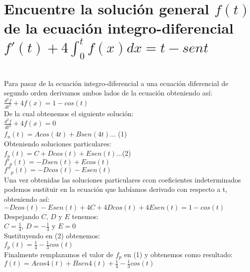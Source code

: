 \section{Encuentre la solución general $f(t)$ de la ecuación integro-diferencial $f'(t)+4 \int_{0}^{t} f(x) dx= t-sent$}\\

Para pasar de la ecuación integro-diferencial a una ecuación diferencial de segundo orden derivamos ambos lados de la ecuación obteniendo así:\\

$\frac{d^{2}f}{dt^{2}}+4f(x)= 1-cos(t)$\\

De la cual obtenemos el siguiente solución:\\

$\frac{d^{2}f}{dt^{2}}+4f(x)=0$\\

$f_n(t)= Acos(4t)+B sen (4t)$... (1)\\

Obteniendo soluciones particulares:\\

$f_p(t)= C + D cos(t) +E sen(t)$...(2)\\

$f'_p(t)= -D sen(t)+ E cos(t)$\\

$f''_p(t)= -D cos(t)- E sen(t)$\\

Una vez obtenidas las soluciones particulares ccon coeficientes indeterminados podemos sustituir en la ecuación que habíamos derivado con respecto a t, obteniendo así:\\

$-Dcos(t)-Esen(t)+4C+4Dcos(t)+4Esen(t)=1-cos(t)$\\

Despejando $C$, $D$ y $E$ tenemos:\\

$C=\frac{1}{4}$, $D=-\frac{1}{3}$ y $E=0$\\

Sustituyendo en (2) obtenemos:\\

$f_p(t)= \frac{1}{4}- \frac{1}{3} cos(t)$\\

Finalmente remplazamos el valor de $f_p$ en (1) y obtenemos como resultado:\\

$f(t)= A cos 4(t)+ Bsen4(t)+ \frac{1}{4}-\frac{1}{3}cos(t)$